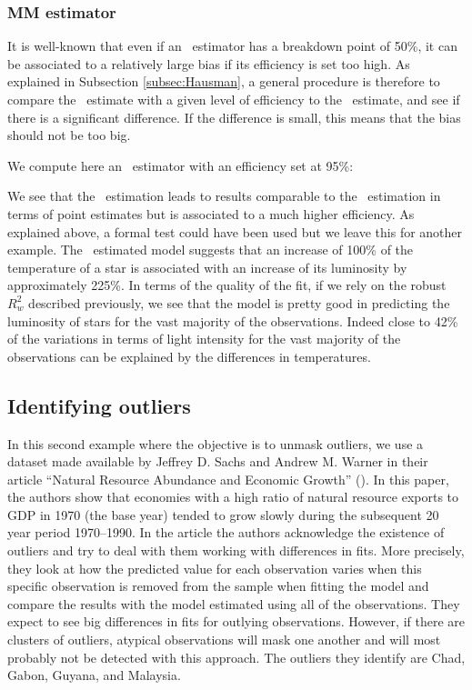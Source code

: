 \subsubsection{MM estimator}

It is well-known that even if an ~estimator has a breakdown point of 50\%,
it can be associated to a relatively large bias if its efficiency is set too
high. As explained in Subsection \ref{subsec:Hausman}, a general procedure is
therefore to compare the ~estimate with a given level of efficiency to the
~estimate, and see if there is a significant difference. If the difference
is small, this means that the bias should not be too big.

We compute here an ~estimator with an efficiency set at 95\%:

\begin{stlog}

\end{stlog}

We see that the ~estimation leads to results comparable to the
~estimation in terms of point estimates but is associated to a much
higher efficiency. As explained above, a formal test could have been used but
we leave this for another example. The ~estimated model suggests that
an increase of 100\% of the temperature of a star is associated with an
increase of its luminosity by approximately 225\%. In terms of the quality of
the fit, if we rely on the robust $R^2_w$ described previously, we see that
the model is pretty good in predicting the luminosity of stars for the vast
majority of the observations. Indeed close to 42\% of the variations in terms
of light intensity for the vast majority of the observations can be explained
by the differences in temperatures.


\subsection{Identifying outliers} 

In this second example where the objective is
to unmask outliers, we use a dataset made available by Jeffrey D. Sachs and
Andrew M. Warner in their article “Natural Resource Abundance
and Economic Growth” (\citeyear{sachs:warner:1997}). In this paper, the authors show
that economies with a high ratio of natural resource exports to GDP in 1970
(the base year) tended to grow slowly during the subsequent 20 year period
1970--1990. In the article the authors acknowledge the existence of outliers and
try to deal with them working with differences in fits. More precisely, they
look at how the predicted value for each observation varies when this specific
observation is removed from the sample when fitting the model and compare the
results with the model estimated using all of the observations. They expect to
see big differences in fits for outlying observations. However, if there are
clusters of outliers, atypical observations will mask one another and will
most probably not be detected with this approach. The outliers they identify
are Chad, Gabon, Guyana, and Malaysia.

